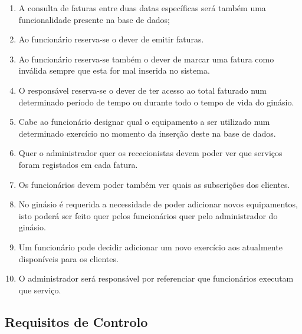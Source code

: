 \begin{enumerate}
    \item A consulta de faturas entre  duas datas específicas será também uma funcionalidade presente na base de dados;
    \item Ao funcionário reserva-se o dever de emitir faturas.
    \item Ao funcionário reserva-se também o dever de marcar uma fatura como inválida sempre que esta for mal inserida no sistema.
    \item O responsável reserva-se o dever de ter acesso ao total faturado num determinado período de tempo ou durante todo o tempo de vida do ginásio.
    \item Cabe ao funcionário designar qual o equipamento a ser utilizado num determinado exercício no momento da inserção deste na base de dados.
    \item Quer o administrador quer os rececionistas devem poder ver que serviços foram registados em cada fatura.
    \item Os funcionários devem poder também ver quais as subscrições dos clientes.
    \item No ginásio é requerida a necessidade de poder adicionar novos equipamentos, isto poderá ser feito quer pelos funcionários quer pelo administrador do ginásio.
    \item Um funcionário pode decidir adicionar um novo exercício aos atualmente disponíveis para os clientes.
    \item O administrador será responsável por referenciar que funcionários executam que serviço.
\end{enumerate}


\subsection{Requisitos de Controlo}

